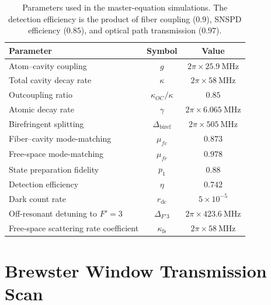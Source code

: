 \begin{table}[ht]
	\centering
	\begin{tabular}{l c c}
		\hline\hline
		Parameter                   & Symbol                  & Value                                 \\
		\hline
		Atom--cavity coupling       & $g$                     & $2\pi \times \SI{25.9}{\mega\hertz}$  \\
		Total cavity decay rate     & $\kappa$                & $2\pi \times \SI{58}{\mega\hertz}$    \\
		Outcoupling ratio           & $\kappa_{OC}/\kappa$    & $0.85$                                \\
		Atomic decay rate           & $\gamma$                & $2\pi \times \SI{6.065}{\mega\hertz}$ \\
		Birefringent splitting      & $\Delta_{\text{biref}}$ & $2\pi \times \SI{505}{\mega\hertz}$   \\
		Fiber--cavity mode-matching & $\mu_{fc}$              & $0.873$                               \\
		Free-space mode-matching    & $\mu_{fr}$              & $0.978$                               \\
		State preparation fidelity  & $p_1$                   & $0.88$                                \\
		Detection efficiency        & $\eta$                  & $0.742$                               \\
		Dark count rate             & $r_{\text{dc}}$         & $5 \times 10^{-5}$                    \\
       Off-resonant detuning to $F'=3$       & $\Delta_{F'3}$       & $2\pi \times \SI{423.6}{\mega\hertz}$ \\
		Free-space scattering rate coefficient & $\kappa_{\text{fs}}$ & $2\pi \times \SI{58}{\mega\hertz}$    \\ 
		\hline
	\end{tabular}
	\caption{Parameters used in the master-equation simulations. The detection efficiency is the product of fiber coupling ($0.9$), SNSPD efficiency ($0.85$), and optical path transmission ($0.97$).}
	\label{tab:sim_params}
\end{table}


\section{Brewster Window Transmission Scan}\label{appendix:bw_scan}


